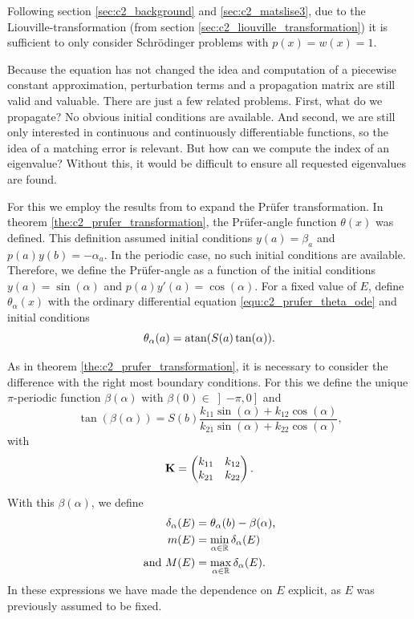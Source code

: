 Following section \ref{sec:c2_background} and \ref{sec:c2_matslise3}, due to the Liouville-transformation (from section \ref{sec:c2_liouville_transformation}) it is sufficient to only consider Schrödinger problems with $p(x) = w(x) = 1$.

Because the equation has not changed the idea and computation of a piecewise constant approximation, perturbation terms and a propagation matrix are still valid and valuable. There are just a few related problems. First, what do we propagate? No obvious initial conditions are available. And second, we are still only interested in continuous and continuously differentiable functions, so the idea of a matching error is relevant. But how can we compute the index of an eigenvalue? Without this, it would be difficult to ensure all requested eigenvalues are found.

For this we employ the results from \cite{binding_prufer_2012,binding_prufer_2013} to expand the Prüfer transformation. In theorem \ref{the:c2_prufer_transformation}, the Prüfer-angle function $\theta(x)$ was defined. This definition assumed initial conditions $y(a) = \beta_a$ and $p(a)y(b) = -\alpha_a$. In the periodic case, no such initial conditions are available. Therefore, we define the Prüfer-angle as a function of the initial conditions $y(a) = \sin(\alpha)$ and $p(a)y'(a) = \cos(\alpha)$. For a fixed value of $E$, define $\theta_\alpha(x)$ with the ordinary differential equation \eqref{equ:c2_prufer_theta_ode} and initial conditions
$$
    \theta_\alpha(a) = \atan(S(a) \tan(\alpha))\text{.}
$$

As in theorem \ref{the:c2_prufer_transformation}, it is necessary to consider the difference with the right most boundary conditions. For this we define the unique $\pi$-periodic function $\beta(\alpha)$ with $\beta(0) \in \left]-\pi, 0\right]$ and
$$
    \tan(\beta(\alpha)) = S(b)\frac{k_{11} \sin(\alpha) + k_{12} \cos(\alpha)}{k_{21} \sin(\alpha) + k_{22} \cos(\alpha)}\text{,}
$$
with
$$
    \vb{K} = \begin{pmatrix}
        k_{11} & k_{12} \\ k_{21} & k_{22}
    \end{pmatrix}\text{.}
$$

With this $\beta(\alpha)$, we define
\begin{align}
    \delta_\alpha(E) & = \theta_\alpha(b) - \beta(\alpha)\text{,} \nonumber                           \\
    m(E)             & = \min_{\alpha \in \mathbb{R}} \delta_\alpha(E) \nonumber                             \\
    \text{and }M(E)  & = \max_{\alpha \in \mathbb{R}}\delta_\alpha(E)\text{.}\label{equ:c2_periodic_m_and_m}
\end{align}
In these expressions we have made the dependence on $E$ explicit, as $E$ was previously assumed to be fixed.

